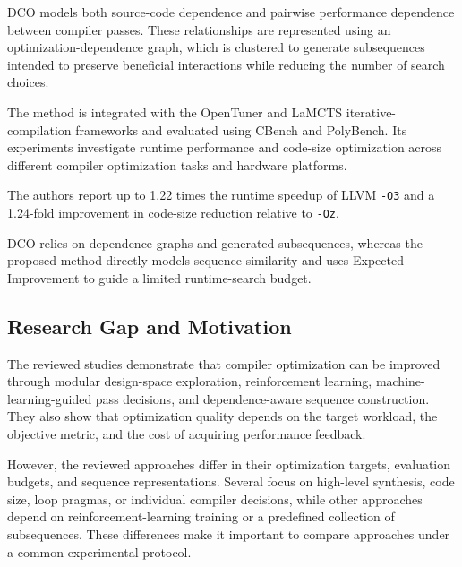 \me{} DCO models both source-code dependence and pairwise performance dependence between compiler passes. These relationships are represented using an optimization-dependence graph, which is clustered to generate subsequences intended to preserve beneficial interactions while reducing the number of search choices.

The method is integrated with the OpenTuner and LaMCTS iterative-compilation frameworks and evaluated using CBench and PolyBench. Its experiments investigate runtime performance and code-size optimization across different compiler optimization tasks and hardware platforms.

\re{} The authors report up to 1.22 times the runtime speedup of LLVM \texttt{-O3} and a 1.24-fold improvement in code-size reduction relative to \texttt{-Oz}.

\rg{} DCO relies on dependence graphs and generated subsequences, whereas the proposed method directly models sequence similarity and uses Expected Improvement to guide a limited runtime-search budget.

\subsection{Research Gap and Motivation}
The reviewed studies demonstrate that compiler optimization can be improved through modular design-space exploration, reinforcement learning, machine-learning-guided pass decisions, and dependence-aware sequence construction. They also show that optimization quality depends on the target workload, the objective metric, and the cost of acquiring performance feedback.

However, the reviewed approaches differ in their optimization targets, evaluation budgets, and sequence representations. Several focus on high-level synthesis, code size, loop pragmas, or individual compiler decisions, while other approaches depend on reinforcement-learning training or a predefined collection of subsequences. These differences make it important to compare approaches under a common experimental protocol.

